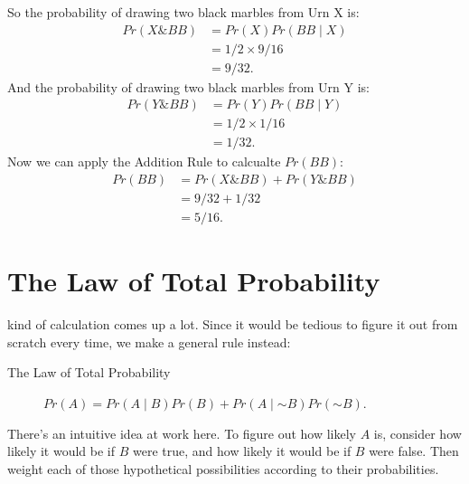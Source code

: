 \documentclass[justified]{tufte-book}
\newcommand{\given}{\mid}
\renewcommand{\neg}{\mathbin{\sim}}
\renewcommand{\wedge}{\mathbin{\&}}
\newcommand{\p}{Pr}
\theoremstyle{definition}
\theoremstyle{definition}
\theoremstyle{definition}
\theoremstyle{remark}
\begin{document}
So the probability of drawing two black marbles from Urn X is:
\[
  \begin{aligned}
    \p(X \wedge BB) &= \p(X) \p(BB \given X)\\
                    &= 1/2 \times 9/16\\
                    &= 9/32.
  \end{aligned}
\]
And the probability of drawing two black marbles from Urn Y is:
\[
  \begin{aligned}
    \p(Y \wedge BB) &= \p(Y) \p(BB \given Y)\\
                    &= 1/2 \times 1/16\\
                    &= 1/32.
  \end{aligned}
\]
Now we can apply the Addition Rule to calcualte \(\p(BB)\):
\[
  \begin{aligned}
    \p(BB) &= \p(X \wedge BB) + \p(Y \wedge BB)\\
           &= 9/32 + 1/32\\
           &= 5/16.
  \end{aligned}
\]

\hypertarget{the-law-of-total-probability}{%
\section{The Law of Total Probability}\label{the-law-of-total-probability}}

 kind of calculation comes up a lot. Since it would be tedious to figure it out from scratch every time, we make a general rule instead:

\begin{description}
\item[The Law of Total Probability]
\(\p(A) = \p(A \given B) \p(B) + \p(A \given \neg B) \p(\neg B)\).
\end{description}

There's an intuitive idea at work here. To figure out how likely \(A\) is, consider how likely it would be if \(B\) were true, and how likely it would be if \(B\) were false. Then weight each of those hypothetical possibilities according to their probabilities.
\end{document}
